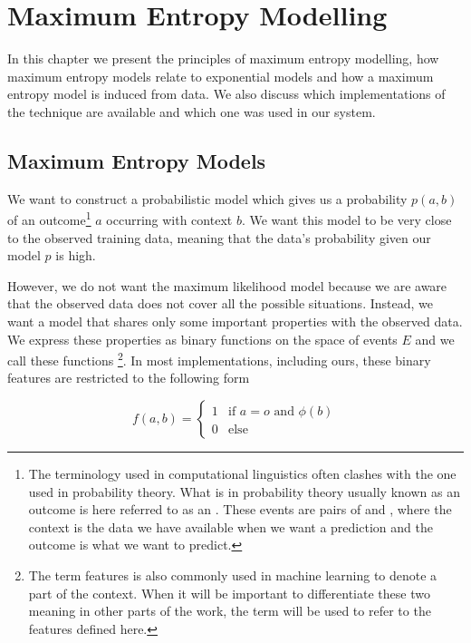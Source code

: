 \chapter{Maximum Entropy Modelling}
\label{chap:maxent}

In this chapter we present the principles of maximum entropy modelling, how
maximum entropy models relate to exponential models and how a maximum entropy
model is induced from data. We also discuss which implementations of the
technique are available and which one was used in our system.

\section{Maximum Entropy Models}
\label{chap:maxent-maxent} 

We want to construct a probabilistic model which gives us a probability
$p(a,b)$ of an outcome\footnote{The terminology used in computational
linguistics often clashes with the one used in probability theory. What is in
probability theory usually known as an outcome is here referred to as an
. These events are pairs of  and
, where the context is the data we have available when we
want a prediction and the outcome is what we want to predict.} $a$ occurring
with context $b$. We want this model to be very close to the observed training
data, meaning that the data's probability given our model $p$ is high.

However, we do not want the maximum likelihood model because we
are aware that the observed data does not cover all the possible situations.
Instead, we want a model that shares only some important properties with the
observed data. We express these properties as binary functions on the space of
events $E$ and we call these functions \footnote{The term
features is also commonly used in machine learning to denote a part of the
context. When it will be important to differentiate these two meaning in other
parts of the work, the term  will be used to
refer to the features defined here.}. In most implementations, including ours,
these binary features are restricted to the following form

\begin{equation}
\label{eq:common-feature}
f(a,b) =
\begin{cases}
  1 & \text{if } a=o \text{ and } \phi(b) \\
  0 & \text{else}
\end{cases}
\end{equation}

